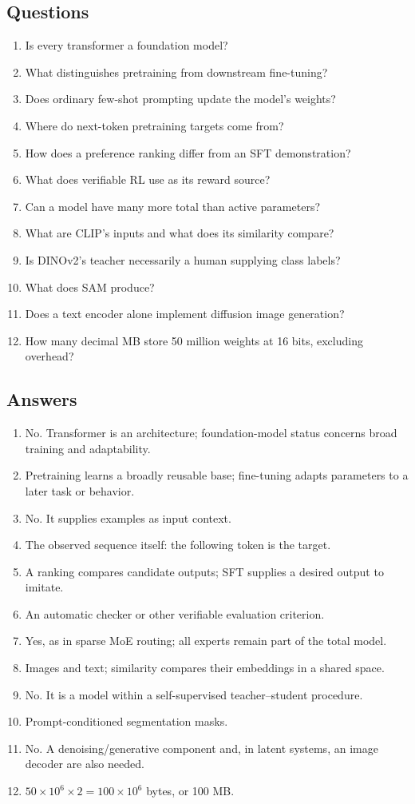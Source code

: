 \documentclass[11pt]{article}
\begin{document}
\subsection{Questions}
\begin{enumerate}
\item Is every transformer a foundation model?
\item What distinguishes pretraining from downstream fine-tuning?
\item Does ordinary few-shot prompting update the model's weights?
\item Where do next-token pretraining targets come from?
\item How does a preference ranking differ from an SFT demonstration?
\item What does verifiable RL use as its reward source?
\item Can a model have many more total than active parameters?
\item What are CLIP's inputs and what does its similarity compare?
\item Is DINOv2's teacher necessarily a human supplying class labels?
\item What does SAM produce?
\item Does a text encoder alone implement diffusion image generation?
\item How many decimal MB store 50 million weights at 16 bits, excluding overhead?
\end{enumerate}
\subsection{Answers}
\begin{enumerate}
\item No. Transformer is an architecture; foundation-model status concerns broad training and adaptability.
\item Pretraining learns a broadly reusable base; fine-tuning adapts parameters to a later task or behavior.
\item No. It supplies examples as input context.
\item The observed sequence itself: the following token is the target.
\item A ranking compares candidate outputs; SFT supplies a desired output to imitate.
\item An automatic checker or other verifiable evaluation criterion.
\item Yes, as in sparse MoE routing; all experts remain part of the total model.
\item Images and text; similarity compares their embeddings in a shared space.
\item No. It is a model within a self-supervised teacher--student procedure.
\item Prompt-conditioned segmentation masks.
\item No. A denoising/generative component and, in latent systems, an image decoder are also needed.
\item $50\times10^6\times2=100\times10^6$ bytes, or 100 MB.
\end{enumerate}
\end{document}
